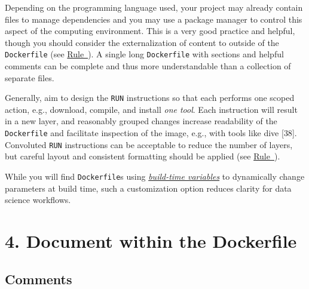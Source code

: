 \documentclass[10pt,letterpaper]{article}
\begin{document}
Depending on the programming language used, your project may already
contain files to manage dependencies and you may use a package manager
to control this aspect of the computing environment. This is a very good
practice and helpful, though you should consider the externalization of
content to outside of the \texttt{Dockerfile} (see
\hyperref[{rule:mount}]{Rule~}). A single long
\texttt{Dockerfile} with sections and helpful comments can be complete
and thus more understandable than a collection of separate files.

Generally, aim to design the \texttt{RUN} instructions so that each
performs one scoped action, e.g., download, compile, and install
\emph{one tool}. Each instruction will result in a new layer, and
reasonably grouped changes increase readability of the
\texttt{Dockerfile} and facilitate inspection of the image, e.g., with
tools like dive {[}38{]}. Convoluted \texttt{RUN} instructions can be
acceptable to reduce the number of layers, but careful layout and
consistent formatting should be applied (see
\hyperref[{rule:formatting}]{Rule~}).

While you will find \texttt{Dockerfile}s using
\href{https://docs.docker.com/engine/reference/commandline/build/\#set-build-time-variables---build-arg}{\emph{build-time
variables}} to dynamically change parameters at build time, such a
customization option reduces clarity for data science workflows.

\hypertarget{document-within-the-dockerfile}{%
\section{4. Document within the
Dockerfile}\label{document-within-the-dockerfile}}

  \label{rule:document} 

\hypertarget{comments}{%
\subsection{Comments}\label{comments}}
\end{document}
